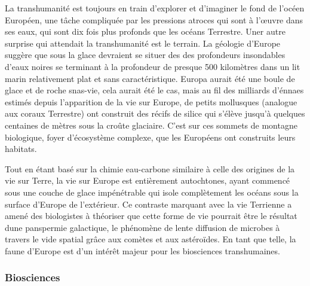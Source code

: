                                                                La transhumanité est toujours en train d'explorer et d'imaginer le fond de l'océen Européen, une tâche compliquée par les pressions atroces qui sont à l'œuvre dans ses eaux, qui sont dix fois plus profonds que les océans Terrestre. Uner autre surprise qui attendait la transhumanité est le terrain. La géologie d'Europe suggère que sous la glace devraient se situer des des profondeurs insondables d'eaux noires se terminant à la profondeur de presque 500 kilomètres dans un lit marin relativement plat et sans caractéristique. Europa aurait été une boule de glace et de roche snas-vie, cela aurait été le cas, mais au fil des milliards d'énnaes estimés depuis l'apparition de la vie sur Europe, de petits mollusques (analogue aux coraux Terrestre) ont construit des récifs de silice qui s'élève jusqu'à quelques centaines de mètres sous la croûte glaciaire. C'est sur ces sommets de montagne biologique, foyer d'écosystème complexe, que les Européens ont construits leurs habitats. 

                                                               Tout en étant basé sur la chimie eau-carbone similaire à celle des origines de la vie sur Terre, la vie sur Europe est entièrement autochtones, ayant commencé sous une couche de glace impénétrable qui isole complètement les océans sous la surface d'Europe de l'extérieur. Ce contraste marquant avec la vie Terrienne a amené des biologistes à théoriser que cette forme de vie pourrait être le résultat dune panspermie galactique, le phénomène de lente diffusion de microbes à travers le vide spatial grâce aux comètes et aux astéroïdes. En tant que telle, la faune d'Europe est d'un intérêt majeur pour les biosciences transhumaines. 

                                                               \subsubsection{Biosciences} \label{sec:biosciences} 

